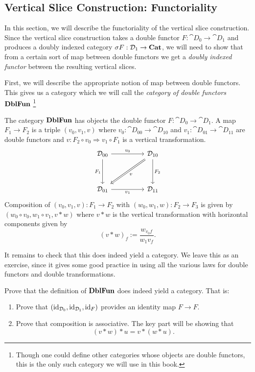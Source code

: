 \documentclass[DynamicalBook]{subfiles}
\begin{document}
\subsection{Vertical Slice Construction: Functoriality}\label{sec.functoriality_vertical_slice}

In this section, we will describe the functoriality of the vertical slice
construction. Since the vertical slice construction takes a double functor $F :
\cat{D}_0 \to \cat{D}_1$ and produces a doubly indexed category $\sigma F :
\mathcal{D}_{1} \to \textbf{Cat}$, we will need to show that from a certain sort of map
between double functors we get a \emph{doubly indexed functor} between the
resulting vertical slices.

First, we will describe the appropriate notion of map between double functors.
This gives us a category which we will call the \emph{category of double
  functors} $\textbf{DblFun}$ \footnote{Though one could define other categories
  whose objects are double
functors, this is the only such category we will use in
this book.}
\begin{definition}
The category $\textbf{DblFun}$ has objects the double functor $F : \cat{D}_0 \to
\cat{D}_1$. A map $F_1 \to F_2$ is a triple $(v_0, v_1, v)$ where $v_0 :
\cat{D}_{00} \to \cat{D}_{10}$ and $v_1 : \cat{D}_{01} \to \cat{D}_{11}$ are
double functors and $v : F_2 \circ v_0 \Rightarrow v_1 \circ F_1$ is a vertical
transformation.
\[
        \begin{tikzcd}
          \cat{D}_{00} \ar[dd, "F_1"'] \ar[rr, "v_0"] & & \cat{D}_{10}
 \ar[dd, "F_2"] \ar[ddll, Rightarrow, "v"] \\
           &  & \\
          \cat{D}_{01} \ar[rr, "v_1"'] & & \cat{D}_{11}
        \end{tikzcd}
\]
Composition of $(v_0, v_1, v) : F_1 \to F_2$ with $(w_0, w_1, w) : F_2 \to F_3$
is given by $(w_0 \circ v_0, w_1 \circ v_1, v \ast w)$ where $v \ast w$ is the
vertical transformation with horizontal components given by
$$(v \ast w)_f := \frac{w_{v_0 f}}{w_1 v_f}.$$
\end{definition}

It remains to check that this does indeed yield a category. We leave this as an
exercise, since it gives some good practice in using all the various laws for
double functors and double transformations.

\begin{exercise}
Prove that the definition of $\textbf{DblFun}$ does indeed yield a category. That
is:
\begin{enumerate}
  \item Prove that $(\mathrm{id}_{\mathcal{D}_0}, \mathrm{id}_{\mathcal{D}_1}, \mathrm{id}_{F})$ provides an
    identity map $F \to F$.
  \item Prove that composition is associative. The key part will be showing that
    $$(v \ast w) \ast u = v \ast (w \ast u).$$
\end{enumerate}
\end{exercise}
\end{document}
